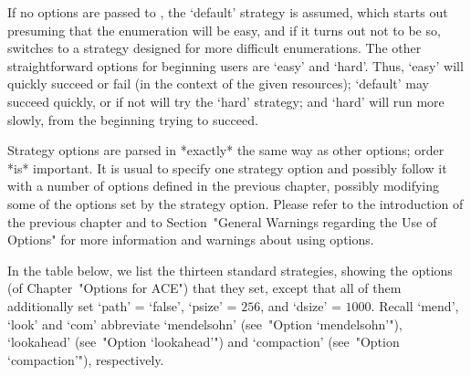 If no options are passed to {\ACE}, the `default' strategy is assumed,
which starts out presuming that the enumeration will be easy,  and  if
it turns out not to be so, {\ACE} switches to a strategy designed  for
more difficult enumerations. The  other  straightforward  options  for
beginning users are `easy'  and  `hard'.  Thus,  `easy'  will  quickly
succeed or fail (in the context of the given resources); `default' may
succeed quickly, or if not will try the `hard'  strategy;  and  `hard'
will run more slowly, from the beginning trying to succeed.

Strategy options are  parsed  in  *exactly*  the  same  way  as  other
options; order *is* important. It is usual  to  specify  one  strategy
option and possibly follow it with a number of options defined in  the
previous chapter, possibly modifying some of the options  set  by  the
strategy option. Please refer to  the  introduction  of  the  previous
chapter and to Section~"General Warnings regarding the Use of Options"
for more  information  and  warnings  about using options.

In the table below, we list the thirteen standard strategies,  showing
the options (of Chapter~"Options for ACE") that they set, except  that
all of them additionally set `path' = `false', `psize'  =  $256$,  and
`dsize'  =  $1000$.  Recall  `mend',  `look'  and   `com'   abbreviate
`mendelsohn'  (see~"Option  `mendelsohn'"),  `lookahead'  (see~"Option
`lookahead'")   and    `compaction'    (see~"Option    `compaction'"),
respectively.

